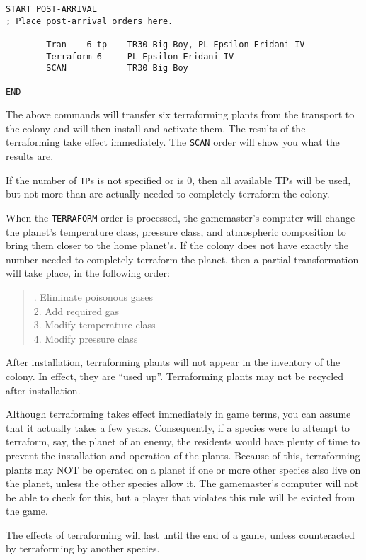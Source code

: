 \documentclass[10pt,titlepage]{article}
\begin{document}
\begin{verbatim}
START POST-ARRIVAL
; Place post-arrival orders here.

        Tran    6 tp    TR30 Big Boy, PL Epsilon Eridani IV
        Terraform 6     PL Epsilon Eridani IV
        SCAN            TR30 Big Boy

END\end{verbatim} 


The above commands will transfer six terraforming plants from the transport
to the colony and will then install and activate them.  The results of the
terraforming take effect immediately.  The \texttt{SCAN} order will show you what the
results are.

If the number of \texttt{TP}s is not specified or is 0, then all available TPs will be
used, but not more than are actually needed to completely terraform the colony.

When the \texttt{TERRAFORM} order is processed, the gamemaster's computer will change
the planet's temperature class, pressure class, and atmospheric composition to
bring them closer to the home planet's.  If the colony does not have exactly
the number needed to completely terraform the planet, then a partial
transformation will take place, in the following order:

\begin{quotation}
	. Eliminate poisonous gases \\
	2. Add required gas \\
	3. Modify temperature class \\
	4. Modify pressure class
\end{quotation} 

After installation, terraforming plants will not appear in the inventory of
the colony.  In effect, they are ``used up''.  Terraforming plants may not be
recycled after installation.

Although terraforming takes effect immediately in game terms, you can assume
that it actually takes a few years.  Consequently, if a species were to attempt
to terraform, say, the planet of an enemy, the residents would have plenty of
time to prevent the installation and operation of the plants.  Because of this,
terraforming plants may NOT be operated on a planet if one or more other
species also live on the planet, unless the other species allow it.  The
gamemaster's computer will not be able to check for this, but a player
that violates this rule will be evicted from the game.

The effects of terraforming will last until the end of a game, unless
counteracted by terraforming by another species.
\end{document}
